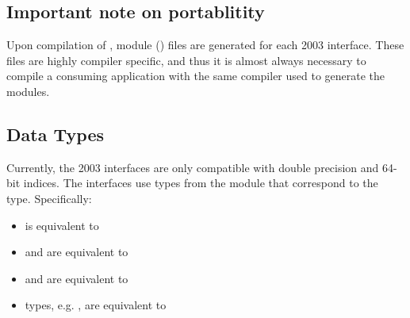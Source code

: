 \subsection{Important note on portablitity}
Upon compilation of {\sundials}, {\F} module () files are generated
for each {\F} 2003 interface. These files are highly compiler specific, and
thus it is almost always necessary to compile a consuming application with the
same compiler used to generate the modules.

\subsection{Data Types}
Currently, the {\F} 2003 interfaces are only compatible with double precision
and 64-bit indices. The interfaces use types from the  module
that correspond to the {\CC} type. Specifically:

\begin{itemize}
  \item {} is equivalent to 
  \item {} and  are equivalent to 
  \item {} and  are equivalent to 
  \item {\sundials} types, e.g. , are equivalent to 
\end{itemize}

